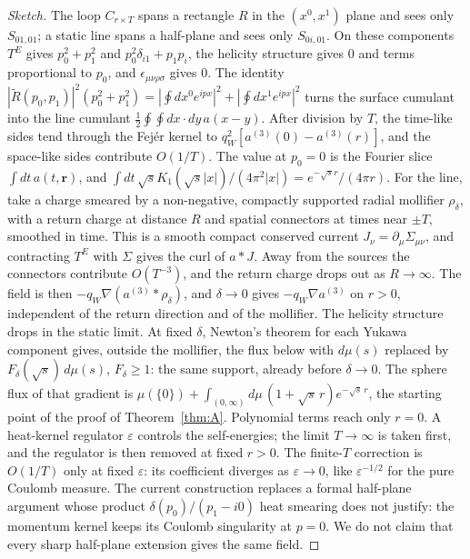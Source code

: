 \begin{proof}[Sketch]
The loop $C_{r\times T}$ spans a rectangle $R$ in the $(x^0,x^1)$ plane and
sees only $S_{01,01}$; a static line spans a half-plane and sees only
$S_{0i,01}$. On these components $T^E$ gives $p_0^2+p_1^2$ and
$p_0^2\delta_{i1}+p_1p_i$, the helicity structure gives $0$ and terms
proportional to $p_0$, and $\epsilon_{\mu\nu\rho\sigma}$ gives $0$. The
identity $|\tilde R(p_0,p_1)|^2(p_0^2+p_1^2)=|\oint dx^0e^{ipx}|^2+|\oint
dx^1e^{ipx}|^2$ turns the surface cumulant into the line cumulant
$\tfrac12\oint\oint dx\cdot dy\,a(x-y)$. After division by $T$, the time-like
sides tend through the Fej\'er kernel to $q_W^2[a^{(3)}(0)-a^{(3)}(r)]$, and
the space-like sides contribute $O(1/T)$. The value at $p_0=0$ is the Fourier
slice $\int dt\,a(t,\mathbf r)$, and
$\int dt\,\sqrt{s}K_1(\sqrt{s}|x|)/(4\pi^2|x|)=e^{-\sqrt{s}r}/(4\pi r)$. For the
line, take a charge smeared by a non-negative, compactly supported radial
mollifier $\rho_\delta$, with a return charge at distance $R$ and spatial connectors at
times near $\pm T$, smoothed in time. This is a smooth compact conserved
current $J_\nu=\partial_\mu\Sigma_{\mu\nu}$, and contracting $T^E$ with $\Sigma$
gives the curl of $a*J$. Away from the sources the connectors contribute
$O(T^{-3})$, and the return charge drops out as $R\to\infty$. The field is then
$-q_W\nabla(a^{(3)}*\rho_\delta)$, and $\delta\to0$ gives $-q_W\nabla a^{(3)}$
on $r>0$, independent of the return direction and of the mollifier. The
helicity structure drops in the static limit. At fixed $\delta$, Newton's
theorem for each Yukawa component gives, outside the mollifier, the flux below
with $d\mu(s)$ replaced by $F_\delta(\sqrt s)\,d\mu(s)$, $F_\delta\ge1$: the
same support, already before $\delta\to0$. The sphere flux of that gradient is
$\mu(\{0\})+\int_{(0,\infty)}d\mu\,(1+\sqrt{s}\,r)e^{-\sqrt{s}\,r}$, the starting
point of the proof of Theorem~\ref{thm:A}. Polynomial terms reach only $r=0$.
A heat-kernel regulator $\varepsilon$ controls the self-energies; the limit
$T\to\infty$ is taken first, and the regulator is then removed at fixed
$r>0$. The finite-$T$ correction is $O(1/T)$ only at fixed $\varepsilon$: its
coefficient diverges as $\varepsilon\to0$, like $\varepsilon^{-1/2}$ for the
pure Coulomb measure. The current construction replaces a formal half-plane
argument whose product $\delta(p_0)/(p_1-i0)$ heat smearing does not justify:
the momentum kernel keeps its Coulomb singularity at $p=0$. We do not claim
that every sharp half-plane extension gives the same field.
\end{proof}

